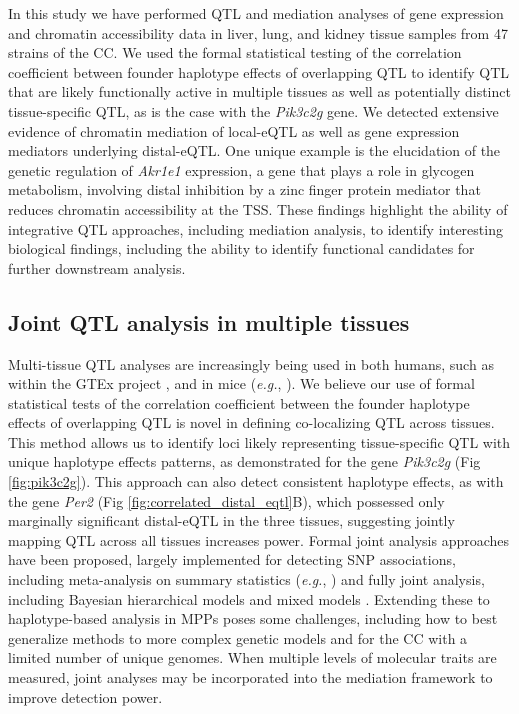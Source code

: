 \documentclass[10pt,letterpaper]{article}
\newcommand{\eg}{\emph{e.g.}\xspace}
\begin{document}
In this study we have performed QTL and mediation analyses of gene expression and chromatin accessibility data in liver, lung, and kidney tissue samples from 47 strains of the CC. We used the formal statistical testing of the correlation coefficient between founder haplotype effects of overlapping QTL to identify QTL that are likely functionally active in multiple tissues as well as potentially distinct tissue-specific QTL, as is the case with the \textit{Pik3c2g} gene. We detected extensive evidence of chromatin mediation of local-eQTL as well as gene expression mediators underlying distal-eQTL. One unique example is the elucidation of the genetic regulation of \textit{Akr1e1} expression, a gene that plays a role in glycogen metabolism, involving distal inhibition by a zinc finger protein mediator that reduces chromatin accessibility at the TSS. These findings highlight the ability of integrative QTL approaches, including mediation analysis, to identify interesting biological findings, including the ability to identify functional candidates for further downstream analysis.

\subsection*{Joint QTL analysis in multiple tissues}

Multi-tissue QTL analyses are increasingly being used in both humans, such as within the GTEx project \cite{GTEX2017}, 
and in mice (\eg, \cite{Huang2009}).
We believe our use of formal statistical tests of the correlation coefficient between the founder haplotype effects of overlapping QTL is novel in defining co-localizing QTL across tissues. This method allows us to identify loci likely representing tissue-specific QTL with unique haplotype effects patterns, as demonstrated for the gene \textit{Pik3c2g} (Fig \ref{fig:pik3c2g}).
This approach can also detect consistent haplotype effects, as with the gene \textit{Per2} (Fig \ref{fig:correlated_distal_eqtl}B), which possessed only marginally significant distal-eQTL in the three tissues, suggesting jointly mapping QTL across all tissues increases power. Formal joint analysis approaches have been proposed, largely implemented for detecting SNP associations, including meta-analysis on summary statistics (\eg, \cite{Fu2012a, Sul2013}) and fully joint analysis, including Bayesian hierarchical models \cite{Flutre2013} and mixed models \cite{Acharya2016}. Extending these to haplotype-based analysis in MPPs poses some challenges, including how to best generalize methods to more complex genetic models and for the CC with a limited number of unique genomes. 
When multiple levels of molecular traits are measured, joint analyses may be incorporated into the mediation framework to improve detection power.
\end{document}
